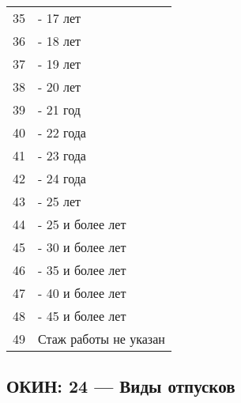 \documentclass[10pt, a4paper, titlepage]{article}
\begin{document}
\begin{center}
\begin{longtable}{rp{}}
        35 & - 17 лет \\
        36 & - 18 лет \\
        37 & - 19 лет \\
        38 & - 20 лет \\
        39 & - 21 год \\
        40 & - 22 года \\
        41 & - 23 года \\
        42 & - 24 года \\
        43 & - 25 лет \\
        44 & - 25 и более лет \\
        45 & - 30 и более лет \\
        46 & - 35 и более лет \\
        47 & - 40 и более лет \\
        48 & - 45 и более лет \\
        49 & Стаж работы не указан \\
    \end{longtable}
\end{center}

\subsection{ОКИН: 24 --- Виды отпусков}
\end{document}
